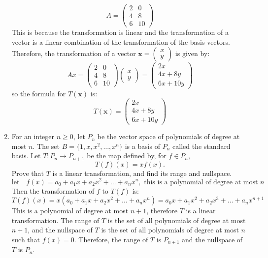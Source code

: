 \documentclass[a3paper,12pt]{extarticle} %
\begin{document}
\begin{enumerate}
    \[
        A = \begin{pmatrix} 2 & 0 \\ 4 & 8 \\ 6 & 10 \end{pmatrix}
    \]
    This is because the transformation is linear and the transformation of a vector is a linear combination of the transformation of the basis vectors. Therefore, the transformation of a vector \(\mathbf{x} = \begin{pmatrix} x \\ y \end{pmatrix}\) is given by:
    \[
        Ax = \begin{pmatrix} 2 & 0 \\ 4 & 8 \\ 6 & 10 \end{pmatrix} \begin{pmatrix} x \\ y \end{pmatrix} = \begin{pmatrix} 2x \\ 4x + 8y \\ 6x + 10y \end{pmatrix}
    \]
    so the formula for \(T(\mathbf{x})\) is:
    \[
        T(\mathbf{x}) = \begin{pmatrix} 2x \\ 4x + 8y \\ 6x + 10y \end{pmatrix}
    \]
    \item For an integer \( n \geq 0 \), let \( P_n \) be the vector space of polynomials of degree at most \( n \). The set \( B = \{1, x, x^2, \ldots, x^n\} \) is a basis of \( P_n \) called the standard basis. Let \( T : P_n \to P_{n+1} \) be the map defined by, for \( f \in P_n \),
    \[
    T(f)(x) = x f(x).
    \]
    Prove that \( T \) is a linear transformation, and find its range and nullspace.
    \[
        \text{let} \quad f(x) = a_0 + a_1x + a_2x^2 + \ldots + a_nx^n, \text{ this is a polynomial of degree at most } n
    \]
    Then the transformation of \( f \) to \( T(f) \) is:   
    \[
        T(f)(x) = x(a_0 + a_1x + a_2x^2 + \ldots + a_nx^n) = a_0x + a_1x^2 + a_2x^3 + \ldots + a_nx^{n+1} 
    \]
    This is a polynomial of degree at most \( n+1 \), therefore \( T \) is a linear transformation. The range of \( T \) is the set of all polynomials of degree at most \( n+1 \), and the nullspace of \( T \) is the set of all polynomials of degree at most \( n \) such that \( f(x) = 0 \). Therefore, the range of \( T \) is \( P_{n+1} \) and the nullspace of \( T \) is \( P_n \).

\end{enumerate}
\end{document}
